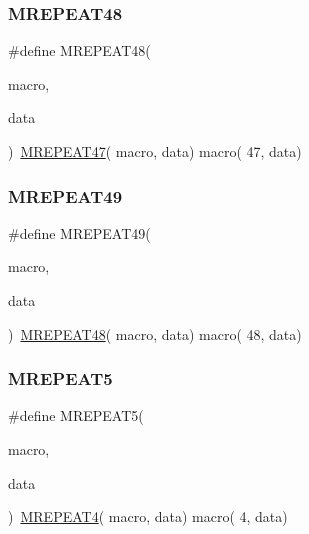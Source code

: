 \mbox{\label{group__group__sam0__utils__mrepeat_ga37c9d35afe9f5aa1eb274a590afeae75}} 
\subsubsection{\texorpdfstring{MREPEAT48}{MREPEAT48}}
{\footnotesize\ttfamily \#define M\+R\+E\+P\+E\+A\+T48(\begin{DoxyParamCaption}\item[{}]{macro,  }\item[{}]{data }\end{DoxyParamCaption})~\mbox{\hyperlink{group__group__sam0__utils__mrepeat_ga31b4cab8f91fc3ca6dbb6d4d501edc3c}{M\+R\+E\+P\+E\+A\+T47}}( macro, data)   macro( 47, data)}

\mbox{\label{group__group__sam0__utils__mrepeat_ga0b8f49d449884ed9753850305fd1e31f}} 
\subsubsection{\texorpdfstring{MREPEAT49}{MREPEAT49}}
{\footnotesize\ttfamily \#define M\+R\+E\+P\+E\+A\+T49(\begin{DoxyParamCaption}\item[{}]{macro,  }\item[{}]{data }\end{DoxyParamCaption})~\mbox{\hyperlink{group__group__sam0__utils__mrepeat_ga37c9d35afe9f5aa1eb274a590afeae75}{M\+R\+E\+P\+E\+A\+T48}}( macro, data)   macro( 48, data)}

\mbox{\label{group__group__sam0__utils__mrepeat_gac581872cbc56cc1e30528c851a7cea40}} 
\subsubsection{\texorpdfstring{MREPEAT5}{MREPEAT5}}
{\footnotesize\ttfamily \#define M\+R\+E\+P\+E\+A\+T5(\begin{DoxyParamCaption}\item[{}]{macro,  }\item[{}]{data }\end{DoxyParamCaption})~\mbox{\hyperlink{group__group__sam0__utils__mrepeat_gaf5ec86cd52c8433725c3b7d756c70a49}{M\+R\+E\+P\+E\+A\+T4}}(  macro, data)   macro(  4, data)}

